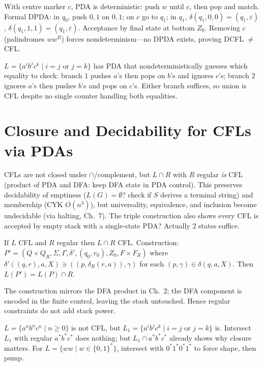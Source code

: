 \begin{example}
With centre marker $c$, PDA is deterministic: push $w$ until $c$, then pop and match. Formal DPDA: in $q_0$, push $0,1$ on $0,1$; on $c$ go to $q_1$; in $q_1$, $\delta(q_1,0,0)=(q_1,\varepsilon)$, $\delta(q_1,1,1)=(q_1,\varepsilon)$. Acceptance by final state at bottom $Z_0$. Removing $c$ (palindromes $ww^R$) forces nondeterminism---no DPDA exists, proving DCFL $\neq$ CFL.
\end{example}

\begin{example}
$L=\{a^ib^jc^k\mid i=j\text{ or }j=k\}$ has PDA that nondeterministically guesses which equality to check: branch $1$ pushes $a$'s then pops on $b$'s and ignores $c$'s; branch $2$ ignores $a$'s then pushes $b$'s and pops on $c$'s. Either branch suffices, so union is CFL despite no single counter handling both equalities.
\end{example}

\section{Closure and Decidability for CFLs via PDAs}
\label{sec:pda-closure}
CFLs are not closed under $\cap$/complement, but $L\cap R$ with $R$ regular \emph{is} CFL (product of PDA and DFA: keep DFA state in PDA control). This preserves decidability of emptiness ($L(G)=\emptyset$? check if $S$ derives a terminal string) and membership (CYK $O(n^3)$), but universality, equivalence, and inclusion become undecidable (via halting, Ch.~7). The triple construction also shows every CFL is accepted by empty stack with a single-state PDA? Actually $2$ states suffice.

\begin{theorem}
If $L$ CFL and $R$ regular then $L\cap R$ CFL. Construction: $P'=(Q\times Q_R,\Sigma,\Gamma,\delta', (q_0,r_0), Z_0, F\times F_R)$ where $\delta'((q,r),a,X)\ni((p,\delta_R(r,a)),\gamma)$ for each $(p,\gamma)\in\delta(q,a,X)$. Then $L(P')=L(P)\cap R$.
\end{theorem}
The construction mirrors the DFA product in Ch.~2; the DFA component is encoded in the finite control, leaving the stack untouched. Hence regular constraints do not add stack power.

\begin{example}
$L=\{a^nb^nc^n\mid n\ge0\}$ is not CFL, but $L_1=\{a^ib^jc^k\mid i=j\text{ or }j=k\}$ is. Intersect $L_1$ with regular $a^*b^*c^*$ does nothing; but $L_1\cap a^*b^*c^*$ already shows why closure matters. For $L=\{ww\mid w\in\{0,1\}^*\}$, intersect with $0^*1^*0^*1^*$ to force shape, then pump.
\end{example}

